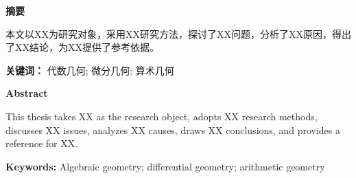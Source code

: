 \documentclass[12pt,a4paper,UTF8]{ctexart}
\begin{document}
\pagestyle{empty} %

 

\newpage


\newpage

\begin{center}
\textbf{\Large\heiti 摘要}
\end{center}
\singlespacing
\setlength{\baselineskip}{20pt} %
\normalsize %
\hspace{2em}
本文以XX为研究对象，采用XX研究方法，探讨了XX问题，分析了XX原因，得出了XX结论，为XX提供了参考依据。\par
\vspace{1em}
\noindent\textbf{\heiti 关键词：}
\normalsize 代数几何; 微分几何; 算术几何

\quad 


\newpage

\begin{center}
\textbf{\Large Abstract}
\end{center}
\singlespacing
\setlength{\baselineskip}{20pt} %
\normalsize
\hspace{2em}
This thesis takes XX as the research object, adopts XX research methods, discusses XX issues, analyzes XX causes, draws XX conclusions, and provides a reference for XX.\par
\vspace{1em}
\noindent\textbf{Keywords:} Algebraic geometry; differential geometry; arithmetic geometry
\vspace{2em}
\newpage


\singlespacing
\setlength{\baselineskip}{20pt} %

\vspace{1em}
\tableofcontents
\vspace{2em}
\newpage
\end{document}
